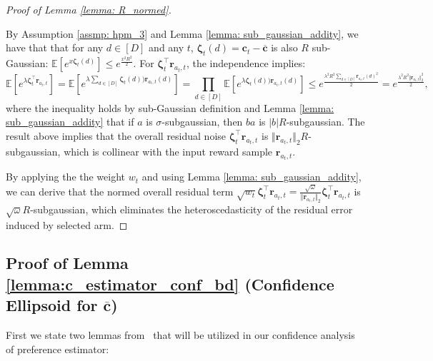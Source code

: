 \begin{proof}[Proof of Lemma \ref{lemma: R_normed}]
\label{sec: app_pf_lemma_R_normed}

By Assumption \ref{assmp: hpm_3} and Lemma \ref{lemma: sub_gaussian_addity}, we have that that for any $d \in [D]$ and any $t$, $\boldsymbol{\zeta}_{t}(d) = \boldsymbol{c}_t - \boldsymbol{\overline{c}}$ is also $R$ sub-Gaussian:
$\mathbb{E}[e^{x\boldsymbol{\zeta}_{t}(d)}] \leq e^{\frac{x^2 R^2}{2}}$.
For $\boldsymbol{\zeta}_{t}^{\top} \boldsymbol{r}_{a_{t}, t}$, the independence implies:
\[
\mathbb{E}[e^{\lambda \boldsymbol{\zeta}_{t}^{\top} \boldsymbol{r}_{a_{t}, t} }]
=
\mathbb{E}[e^{\lambda \sum_{d \in [D]} \boldsymbol{\zeta}_{t}(d)) \boldsymbol{r}_{a_{t}, t}(d) }]
= 
\prod_{d \in [D]} \mathbb{E}[e^{\lambda \boldsymbol{\zeta}_{t}(d)) \boldsymbol{r}_{a_{t}, t}(d) }]
\leq
e^{\frac{\lambda^2 R^2 \sum_{d \in [D]} \boldsymbol{r}_{a_{t}, t}(d)^2 }{2}}
=
e^{\frac{\lambda^2 R^2 \Vert \boldsymbol{r}_{a_{t}, t} \Vert_2^2 }{2}},
\]
where the inequality holds by sub-Gaussian definition and Lemma \ref{lemma: sub_gaussian_addity} that if 
$a$ is $\sigma$-subgaussian, then $ba$ is $\vert b \vert R$-subgaussian. 
The result above implies that the overall residual noise $\boldsymbol{\zeta}_{t}^{\top} \boldsymbol{r}_{a_{t}, t}$ is $\Vert \boldsymbol{r}_{a_{t}, t} \Vert_2 R$-subgaussian, which is collinear with the input reward sample $\boldsymbol{r}_{a_{t}, t}$. 

By applying the the weight $w_{t}$ and using Lemma \ref{lemma: sub_gaussian_addity}, we can derive that the normed overall residual term $\sqrt{w_t} \boldsymbol{\zeta}_{t}^{\top} \boldsymbol{r}_{a_{t}, t} = \frac{\sqrt{\omega}}{\Vert \boldsymbol{r}_{a_{t}, t} \Vert_2} \boldsymbol{\zeta}_{t}^{\top} \boldsymbol{r}_{a_{t}, t}$ is $\sqrt{\omega} R$-subgaussian, which eliminates the heteroscedasticity of the residual error induced by selected arm.
\end{proof}


\subsection{Proof of Lemma \ref{lemma:c_estimator_conf_bd} (Confidence Ellipsoid for $\boldsymbol{\overline{c}}$)}
\label{sec:app_proof_lemma_c_estimator_conf_bd}


First we state two lemmas from~\cite{abbasi2011improved} that will be utilized in our confidence analysis of preference estimator:

